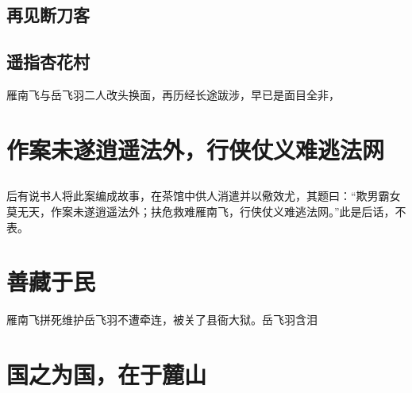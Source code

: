 \section{再见断刀客}
\section{遥指杏花村}

雁南飞与岳飞羽二人改头换面，再历经长途跋涉，早已是面目全非，


\chapter{作案未遂逍遥法外，行侠仗义难逃法网}


\section{}
\section{}
\section{}

后有说书人将此案编成故事，在茶馆中供人消遣并以儆效尤，其题曰：“欺男霸女莫无天，作案未遂逍遥法外；扶危救难雁南飞，行侠仗义难逃法网。”此是后话，不表。




\chapter{善藏于民}
雁南飞拼死维护岳飞羽不遭牵连，被关了县衙大狱。岳飞羽含泪

\section{}
\section{}
\section{}
\section{}



\chapter{国之为国，在于麓山}
